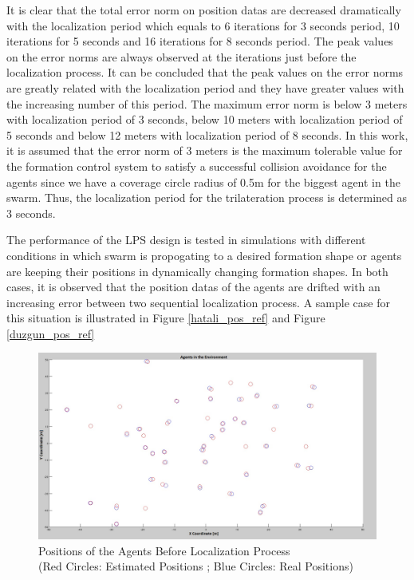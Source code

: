 It is clear that the total error norm on position datas are decreased dramatically with the localization period which equals to 6 iterations for 3 seconds period, 10 iterations for 5 seconds and 16 iterations for 8 seconds period. The peak values on the error norms are always observed at the iterations just before the localization process. It can be concluded that the peak values on the error norms are greatly related with the localization period and they have greater values with the increasing number of this period. The maximum error norm is below 3 meters with localization period of 3 seconds, below 10 meters with localization period of 5 seconds and below 12 meters with localization period of 8 seconds. In this work, it is assumed that the error norm of 3 meters is the maximum tolerable value for the formation control system to satisfy a successful collision avoidance for the agents since we have a coverage circle radius of 0.5m for the biggest agent in the swarm. Thus, the localization period for the trilateration process is determined as 3 seconds. 

The performance of the LPS design is tested in simulations with different conditions in which swarm is propogating to a desired formation shape or agents are keeping their positions in dynamically changing formation shapes.  In both cases, it is observed that the position datas of the agents are drifted with an increasing error between two  sequential localization process. A sample case for this situation is illustrated in Figure \ref{hatali_pos_ref} and Figure \ref{duzgun_pos_ref}

\begin{figure}[H]
\centering
\captionsetup{format=hang,justification=centerfirst}
\caption{Positions of the Agents Before Localization Process \\
(Red Circles: Estimated Positions ; Blue Circles: Real Positions)} \label{hatali_pos_ref}
\centerline{
\includegraphics[scale = 0.27]{Pozisyon_1_Hatali}}
\label{fig:lps}
\end{figure}

